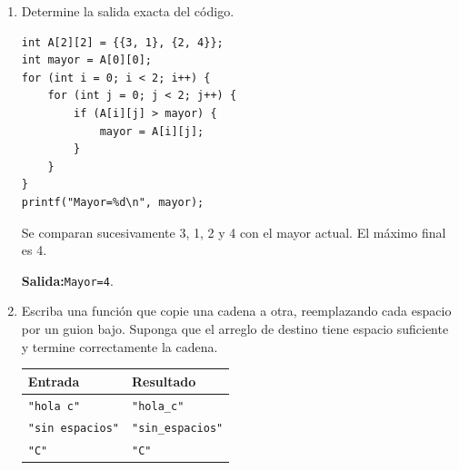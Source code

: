 \begin{enumerate}[label=\textbf{\arabic*.}]
\begin{enumerate}[label=(\alph*)]
\item Escriba una condición que identifique los datos inválidos.
\ifpauta\begin{solucionbox}\texttt{cantidad <= 0 || cantidad > 50}.\end{solucionbox}\else\vspace{1.5cm}\fi
\item Escriba un fragmento que imprima \texttt{Dato aceptado} solo si el valor es válido; en caso contrario, imprima \texttt{Revisar dato}.
\ifpauta\begin{solucionbox}\begin{lstlisting}[style=customc]
if (cantidad > 0 && cantidad <= 50) {
    printf("Dato aceptado\n");
} else {
    printf("Revisar dato\n");
}
\end{lstlisting}\end{solucionbox}\else\vspace{2cm}\fi
\item Clasifique los valores \texttt{0}, \texttt{1}, \texttt{50} y \texttt{51}.
\ifpauta\begin{solucionbox}0: inválido; 1: válido; 50: válido; 51: inválido.\end{solucionbox}\else\vspace{2cm}\fi
\end{enumerate}
\newpage
\item Determine la salida exacta del código.
\begin{lstlisting}[style=customc]
int A[2][2] = {{3, 1}, {2, 4}};
int mayor = A[0][0];
for (int i = 0; i < 2; i++) {
    for (int j = 0; j < 2; j++) {
        if (A[i][j] > mayor) {
            mayor = A[i][j];
        }
    }
}
printf("Mayor=%d\n", mayor);
\end{lstlisting}
\ifpauta\begin{solucionbox}Se comparan sucesivamente 3, 1, 2 y 4 con el mayor actual. El máximo final es 4.\par\textbf{Salida:}\texttt{Mayor=4}.\end{solucionbox}\else\vspace{3cm}\fi
\item Escriba una función que copie una cadena a otra, reemplazando cada espacio por un guion bajo. Suponga que el arreglo de destino tiene espacio suficiente y termine correctamente la cadena.
\begin{center}\begin{tabular}{ll}\toprule\textbf{Entrada} & \textbf{Resultado}\\\midrule\texttt{"hola c"} & \texttt{"hola\_c"}\\\texttt{"sin espacios"} & \texttt{"sin\_espacios"}\\\texttt{"C"} & \texttt{"C"}\\\bottomrule\end{tabular}\end{center}

\end{enumerate}
